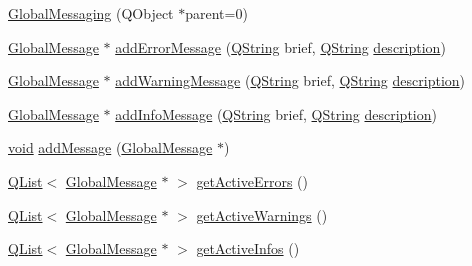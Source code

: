 \begin{DoxyCompactItemize}
\item 
\hyperlink{group___core_plugin_ga38edb7cbf48000dc01e7b3221af4f2e5}{Global\-Messaging} (Q\-Object $\ast$parent=0)
\item 
\hyperlink{class_core_1_1_global_message}{Global\-Message} $\ast$ \hyperlink{group___core_plugin_ga6a4a87e17bd2e18c6edfdcfcf2c8110f}{add\-Error\-Message} (\hyperlink{group___u_a_v_objects_plugin_gab9d252f49c333c94a72f97ce3105a32d}{Q\-String} brief, \hyperlink{group___u_a_v_objects_plugin_gab9d252f49c333c94a72f97ce3105a32d}{Q\-String} \hyperlink{sdlgamepad_8dox_ae82208d022e4246ddf1e4f481a3f81b0}{description})
\item 
\hyperlink{class_core_1_1_global_message}{Global\-Message} $\ast$ \hyperlink{group___core_plugin_ga57358d48eab5fd8fb7741daa9fa5244a}{add\-Warning\-Message} (\hyperlink{group___u_a_v_objects_plugin_gab9d252f49c333c94a72f97ce3105a32d}{Q\-String} brief, \hyperlink{group___u_a_v_objects_plugin_gab9d252f49c333c94a72f97ce3105a32d}{Q\-String} \hyperlink{sdlgamepad_8dox_ae82208d022e4246ddf1e4f481a3f81b0}{description})
\item 
\hyperlink{class_core_1_1_global_message}{Global\-Message} $\ast$ \hyperlink{group___core_plugin_gab22b7c8008fd1803cb7c9454e9b0b6ec}{add\-Info\-Message} (\hyperlink{group___u_a_v_objects_plugin_gab9d252f49c333c94a72f97ce3105a32d}{Q\-String} brief, \hyperlink{group___u_a_v_objects_plugin_gab9d252f49c333c94a72f97ce3105a32d}{Q\-String} \hyperlink{sdlgamepad_8dox_ae82208d022e4246ddf1e4f481a3f81b0}{description})
\item 
\hyperlink{group___u_a_v_objects_plugin_ga444cf2ff3f0ecbe028adce838d373f5c}{void} \hyperlink{group___core_plugin_ga84d8602d51725819aa01a780228ec680}{add\-Message} (\hyperlink{class_core_1_1_global_message}{Global\-Message} $\ast$)
\item 
\hyperlink{class_q_list}{Q\-List}$<$ \hyperlink{class_core_1_1_global_message}{Global\-Message} $\ast$ $>$ \hyperlink{group___core_plugin_ga954e7a8f68b28e184a6a78d796fd1460}{get\-Active\-Errors} ()
\item 
\hyperlink{class_q_list}{Q\-List}$<$ \hyperlink{class_core_1_1_global_message}{Global\-Message} $\ast$ $>$ \hyperlink{group___core_plugin_ga5eb61031e9fe3f0b3dc6e9b4b56ec1a6}{get\-Active\-Warnings} ()
\item 
\hyperlink{class_q_list}{Q\-List}$<$ \hyperlink{class_core_1_1_global_message}{Global\-Message} $\ast$ $>$ \hyperlink{group___core_plugin_gae228917eca7ba668fa70bcda27ff3067}{get\-Active\-Infos} ()

\end{DoxyCompactItemize}
